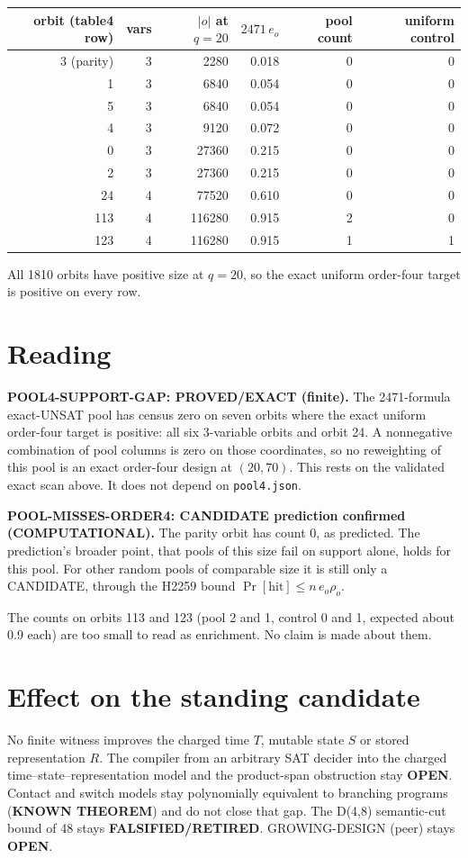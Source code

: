 \documentclass[11pt]{article}
\begin{document}
\begin{center}\begin{tabular}{rrrrrr}\toprule
orbit (table4 row) & vars & $|o|$ at $q=20$ & $2471\,e_o$ & pool count & uniform control\\\midrule
3 (parity) & 3 & 2280 & 0.018 & 0 & 0\\
1 & 3 & 6840 & 0.054 & 0 & 0\\
5 & 3 & 6840 & 0.054 & 0 & 0\\
4 & 3 & 9120 & 0.072 & 0 & 0\\
0 & 3 & 27360 & 0.215 & 0 & 0\\
2 & 3 & 27360 & 0.215 & 0 & 0\\
24 & 4 & 77520 & 0.610 & 0 & 0\\
113 & 4 & 116280 & 0.915 & 2 & 0\\
123 & 4 & 116280 & 0.915 & 1 & 1\\\bottomrule
\end{tabular}\end{center}
All 1810 orbits have positive size at $q=20$, so the exact uniform order-four target is positive on every row.

\section*{Reading}
\textbf{POOL4-SUPPORT-GAP: PROVED/EXACT (finite).} The 2471-formula exact-UNSAT pool has census zero on seven orbits where the exact uniform order-four target is positive: all six 3-variable orbits and orbit 24. A nonnegative combination of pool columns is zero on those coordinates, so no reweighting of this pool is an exact order-four design at $(20,70)$. This rests on the validated exact scan above. It does not depend on \texttt{pool4.json}.

\textbf{POOL-MISSES-ORDER4: CANDIDATE prediction confirmed (COMPUTATIONAL).} The parity orbit has count 0, as predicted. The prediction's broader point, that pools of this size fail on support alone, holds for this pool. For other random pools of comparable size it is still only a CANDIDATE, through the H2259 bound $\Pr[\text{hit}]\le n\,e_o\rho_o$.

The counts on orbits 113 and 123 (pool 2 and 1, control 0 and 1, expected about 0.9 each) are too small to read as enrichment. No claim is made about them.

\section*{Effect on the standing candidate}
No finite witness improves the charged time $T$, mutable state $S$ or stored representation $R$. The compiler from an arbitrary SAT decider into the charged time--state--representation model and the product-span obstruction stay \textbf{OPEN}. Contact and switch models stay polynomially equivalent to branching programs (\textbf{KNOWN THEOREM}) and do not close that gap. The D(4,8) semantic-cut bound of 48 stays \textbf{FALSIFIED/RETIRED}. GROWING-DESIGN (peer) stays \textbf{OPEN}.
\end{document}
